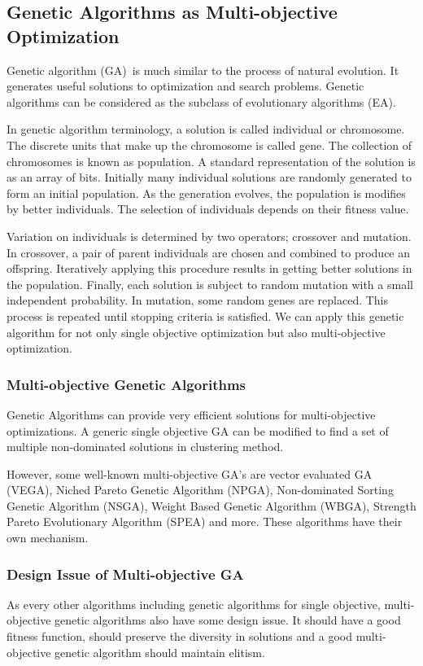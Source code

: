 \subsection {Genetic Algorithms as Multi-objective Optimization}
Genetic algorithm (GA) is much similar to the process of natural evolution. It generates useful solutions to optimization and search problems. Genetic algorithms can be considered as the subclass of evolutionary algorithms (EA).

In genetic algorithm terminology, a solution is called individual or chromosome\cite{gen3}. The discrete units that make up the chromosome is called gene. The collection of chromosomes is known as population. A standard representation of the solution is as an array of bits. 
Initially many individual solutions are randomly generated to form an initial population. As the generation evolves, the population is modifies by better individuals. The selection of individuals depends on their fitness value. 

Variation on individuals is determined by two operators; crossover and mutation. In crossover, a pair of parent individuals are chosen and combined to produce an offspring. Iteratively applying this procedure results in getting better solutions in the population. Finally, each solution is subject to random mutation with a small independent probability. In mutation, some random genes are replaced. This process is repeated until stopping criteria is satisfied. We can apply this genetic algorithm for not only single objective optimization but also multi-objective optimization. 

\subsubsection {Multi-objective Genetic Algorithms}
Genetic Algorithms can provide very efficient solutions for multi-objective optimizations. A generic single objective GA can be modified to find a set of multiple non-dominated solutions in clustering method. 

However, some well-known multi-objective GA’s are vector evaluated GA (VEGA)\cite{vega}, Niched Pareto Genetic Algorithm (NPGA)\cite{npga}, Non-dominated Sorting Genetic Algorithm (NSGA)\cite{nsga}, Weight Based Genetic Algorithm (WBGA)\cite{wbga}, Strength Pareto Evolutionary Algorithm (SPEA)\cite{spea} and more. These algorithms have their own mechanism.

\subsubsection {Design Issue of Multi-objective GA}
As every other algorithms including genetic algorithms for single objective, multi-objective genetic algorithms also have some design issue. It should have a good fitness function, should preserve the diversity in solutions and a good multi-objective genetic algorithm should maintain elitism.
